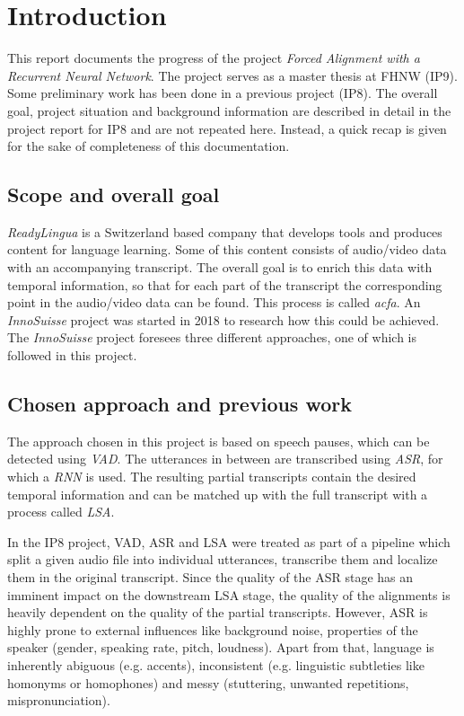 \section{Introduction}\label{intro}
This report documents the progress of the project \textit{Forced Alignment with a Recurrent Neural Network}. The project serves as a master thesis at \ac{FHNW} (IP9). Some preliminary work has been done in a previous project (IP8). The overall goal, project situation and background information are described in detail in the project report for IP8 and are not repeated here. Instead, a quick recap is given for the sake of completeness of this documentation.

\subsection{Scope and overall goal}
\textit{ReadyLingua} is a Switzerland based company that develops tools and produces content for language learning. Some of this content consists of audio/video data with an accompanying transcript. The overall goal is to enrich this data with temporal information, so that for each part of the transcript the corresponding point in the audio/video data can be found. This process is called \textit{ac{fa}}. An \textit{InnoSuisse} project was started in 2018 to research how this could be achieved. The \textit{InnoSuisse} project foresees three different approaches, one of which is followed in this project.

\subsection{Chosen approach and previous work}
The approach chosen in this project is based on speech pauses, which can be detected using \textit{\ac{VAD}}. The utterances in between are transcribed using \textit{\ac{ASR}}, for which a \textit{\ac{RNN}} is used. The resulting partial transcripts contain the desired temporal information and can be matched up with the full transcript with a process called \textit{\ac{LSA}}.

In the IP8 project, \ac{VAD}, \ac{ASR} and \ac{LSA} were treated as part of a pipeline which split a given audio file into individual utterances, transcribe them and localize them in the original transcript. Since the quality of the \ac{ASR} stage has an imminent impact on the downstream \ac{LSA} stage, the quality of the alignments is heavily dependent on the quality of the partial transcripts. However, \ac{ASR} is highly prone to external influences like background noise, properties of the speaker (gender, speaking rate, pitch, loudness). Apart from that, language is inherently abiguous (e.g. accents), inconsistent (e.g. linguistic subtleties like homonyms or homophones) and messy (stuttering, unwanted repetitions, mispronunciation).

